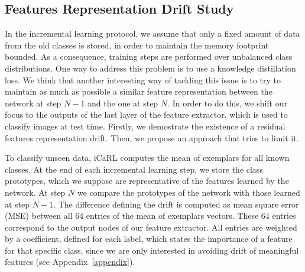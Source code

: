 \documentclass[10pt,twocolumn,letterpaper]{article}
\begin{document}
\subsection{Features Representation Drift Study}
\label{frds}
In the incremental learning protocol, we assume that only a fixed amount of data from the old classes is stored, in order to maintain the memory footprint bounded. As a consequence, training steps are performed over unbalanced class distributions. One way to address this problem is to use a knowledge distillation loss. We think that another interesting way of tackling this issue is to try to maintain as much as possible a similar feature representation between the network at step $N-1$ and the one at step $N$. In order to do this, we shift our focus to the outputs of the last layer of the feature extractor, which is used to classify images at test time. Firstly, we demostrate the existence of a residual features representation drift. Then, we propose an approach that tries to limit it.

To classify unseen data, iCaRL computes the mean of exemplars for all known classes. At the end of each incremental learning step, we store the class prototypes, which we suppose are representative of the features learned by the network. At step $N$ we compare the prototypes of the network with those learned at step $N-1$. The difference defining the drift is computed as mean square error (MSE) between all $64$ entries of the mean of exemplars vectors. These $64$ entries correspond to the output nodes of our feature extractor. All entries are weighted by a coefficient, defined for each label, which states the importance of a feature for that specific class, since we are only interested in avoiding drift of meaningful features (see Appendix~\ref{appendix}).
\end{document}
